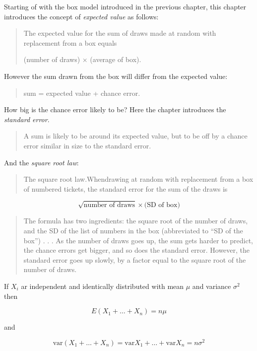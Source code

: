 \documentclass[
]{book}
\begin{document}
Starting of with the box model introduced in the previous chapter, this chapter introduces the concept of \emph{expected value} as follows:

\begin{quote}
The expected value for the sum of draws made at random with replacement from a box equals

(number of draws) × (average of box).
\end{quote}

However the sum drawn from the box will differ from the expected value:

\begin{quote}
sum = expected value + chance error.
\end{quote}

How big is the chance error likely to be? Here the chapter introduces the \emph{standard error}.

\begin{quote}
A sum is likely to be around its expected value, but to be off by a chance error similar in size to the standard error.
\end{quote}

And the \emph{square root law}:

\begin{quote}
The square root law.Whendrawing at random with replacement from a box of numbered tickets, the standard error for the sum of the draws is
\end{quote}

\[
\sqrt{\text{number of draws}} \times \text{(SD of box)}
\]

\begin{quote}
The formula has two ingredients: the square root of the number of draws, and the SD of the list of numbers in the box (abbreviated to ``SD of the box'') . . . As the number of draws goes up, the sum gets harder to predict, the chance errors get bigger, and so does the standard error. However, the standard error goes up slowly, by a factor equal to the square root of the number of draws.
\end{quote}

If \(X_i\) ar independent and identically distributed with mean \(\mu\) and variance \(\sigma^2\) then

\[
E\left(X_1 + \dots + X_n\right) = n\mu
\]

and

\[
\text{var}\left(X_1 + \dots + X_n\right) = \text{var}X_1 + \dots + \text{var}X_n = n\sigma^2
\]
\end{document}
